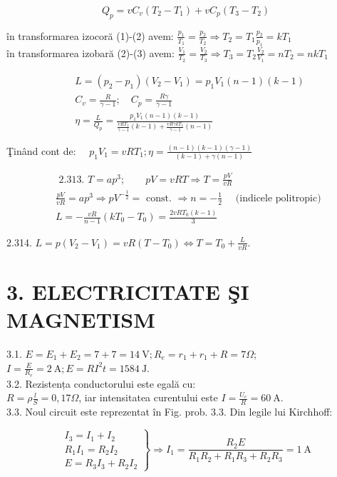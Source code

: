 \documentclass[10pt]{article}
\begin{document}
$$
Q_{p}=v C_{v}\left(T_{2}-T_{1}\right)+v C_{p}\left(T_{3}-T_{2}\right)
$$

în transformarea izocoră (1)-(2) avem: $\frac{p_{1}}{T_{1}}=\frac{p_{2}}{T_{2}} \Rightarrow T_{2}=T_{1} \frac{p_{2}}{p_{1}}=k T_{1}$\\
în transformarea izobară (2)-(3) avem: $\frac{V_{1}}{T_{2}}=\frac{V_{2}}{T_{3}} \Rightarrow T_{3}=T_{2} \frac{V_{2}}{V_{1}}=n T_{2}=n k T_{1}$

$$
\begin{aligned}
& L=\left(p_{2}-p_{1}\right)\left(V_{2}-V_{1}\right)=p_{1} V_{1}(n-1)(k-1) \\
& C_{v}=\frac{R}{\gamma-1} ; \quad C_{p}=\frac{R \gamma}{\gamma-1} \\
& \eta=\frac{L}{Q_{p}}=\frac{p_{1} V_{1}(n-1)(k-1)}{\frac{v R T_{1}}{\gamma-1}(k-1)+\frac{v R \gamma k T_{1}}{\gamma-1}(n-1)}
\end{aligned}
$$

Ţinând cont de: $\quad p_{1} V_{1}=v R T_{1} ; \eta=\frac{(n-1)(k-1)(\gamma-1)}{(k-1)+\gamma(n-1)}$

$$
\begin{aligned}
& \text { 2.313. } T=a p^{3} ; \quad \quad p V=v R T \Rightarrow T=\frac{p V}{v R} \\
& \frac{p V}{v R}=a p^{3} \Rightarrow p V^{-\frac{1}{2}}=\text { const. } \Rightarrow n=-\frac{1}{2} \quad \text { (indicele politropic) } \\
& L=-\frac{v R}{n-1}\left(k T_{0}-T_{0}\right)=\frac{2 v R T_{0}(k-1)}{3}
\end{aligned}
$$

2.314. $L=p\left(V_{2}-V_{1}\right)=v R\left(T-T_{0}\right) \Leftrightarrow T=T_{0}+\frac{L}{v R}$.

\section*{3. ELECTRICITATE ŞI MAGNETISM}
3.1. $E=E_{1}+E_{2}=7+7=14 \mathrm{~V} ; R_{e}=r_{1}+r_{1}+R=7 \Omega$;\\
$I=\frac{E}{R_{e}}=2 \mathrm{~A} ; E=R I^{2} t=1584 \mathrm{~J}$.\\
3.2. Rezistența conductorului este egală cu:\\
$R=\rho \frac{l}{S}=0,17 \Omega$, iar intensitatea curentului este $I=\frac{U_{c}}{R}=60 \mathrm{~A}$.\\
3.3. Noul circuit este reprezentat în Fig. prob. 3.3. Din legile lui Kirchhoff:

$$
\left.\begin{array}{l}
I_{3}=I_{1}+I_{2} \\
R_{1} I_{1}=R_{2} I_{2} \\
E=R_{3} I_{3}+R_{2} I_{2}
\end{array}\right\} \Rightarrow I_{1}=\frac{R_{2} E}{R_{1} R_{2}+R_{1} R_{3}+R_{2} R_{3}}=1 \mathrm{~A}
$$
\end{document}

